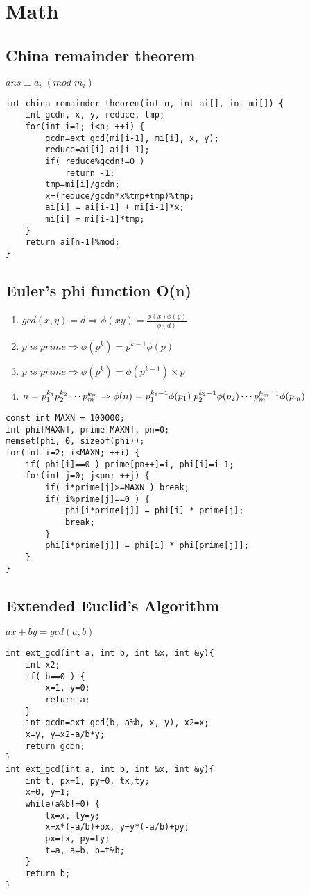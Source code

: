 \documentclass[11pt,twocolumn,a4paper]{article}
\begin{document}

\newpage
\section{Math}
\subsection{China remainder theorem}
$ ans \equiv  a_i\; (mod\; m_i) $
\begin{lstlisting}[label=China remainder theorem]
int china_remainder_theorem(int n, int ai[], int mi[]) {
	int gcdn, x, y, reduce, tmp;
	for(int i=1; i<n; ++i) {
		gcdn=ext_gcd(mi[i-1], mi[i], x, y);
		reduce=ai[i]-ai[i-1];
		if( reduce%gcdn!=0 )
			return -1;
		tmp=mi[i]/gcdn;
		x=(reduce/gcdn*x%tmp+tmp)%tmp;
		ai[i] = ai[i-1] + mi[i-1]*x;
		mi[i] = mi[i-1]*tmp;
	}
	return ai[n-1]%mod;
}
\end{lstlisting}

\subsection{Euler's phi function O(n)}
\begin{enumerate}[1.]
\item $gcd(x,y)=d \Rightarrow \phi(xy) = \frac{\phi(x) \phi(y)}{\phi(d)}$
\item $p\; is\; prime \Rightarrow \phi(p^k) = p^{k-1} \phi(p)$
\item $p\; is\; prime \Rightarrow \phi(p^k) = \phi(p^{k-1}) \times p$
\item $n = p_{1}^{k_1} p_{2}^{k_2} \cdots p_{m}^{k_m}\\
\Rightarrow \phi(n) = p_{1}^{k_1-1}\phi(p_1)\; p_{2}^{k_2-1}\phi(p_2) \cdots p_{m}^{k_m-1}\phi(p_m)$
\end{enumerate}

\begin{lstlisting}[label=Euler's phi function O(n)]
const int MAXN = 100000;
int phi[MAXN], prime[MAXN], pn=0;
memset(phi, 0, sizeof(phi));
for(int i=2; i<MAXN; ++i) {
	if( phi[i]==0 ) prime[pn++]=i, phi[i]=i-1;
	for(int j=0; j<pn; ++j) {
		if( i*prime[j]>=MAXN ) break;
		if( i%prime[j]==0 ) {
			phi[i*prime[j]] = phi[i] * prime[j];
			break;
		}
		phi[i*prime[j]] = phi[i] * phi[prime[j]];
	}
}
\end{lstlisting}

\subsection{Extended Euclid's Algorithm}
$ ax+by=gcd(a,b) $
\begin{lstlisting}[label=Extended Euclid's Algorithm]
int ext_gcd(int a, int b, int &x, int &y){
	int x2;
	if( b==0 ) {
		x=1, y=0;
		return a;
	}
	int gcdn=ext_gcd(b, a%b, x, y), x2=x;
	x=y, y=x2-a/b*y;
	return gcdn;
}
int ext_gcd(int a, int b, int &x, int &y){
	int t, px=1, py=0, tx,ty;
	x=0, y=1;
	while(a%b!=0) {
		tx=x, ty=y;
		x=x*(-a/b)+px, y=y*(-a/b)+py;
		px=tx, py=ty;
		t=a, a=b, b=t%b;
	}
	return b;
}
\end{lstlisting}
\end{document}
